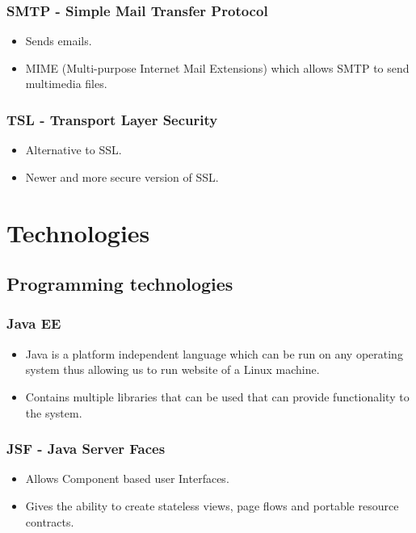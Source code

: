 \documentclass[12pt, oneside]{article}
\begin{document}
		\subsubsection{SMTP - Simple Mail Transfer Protocol}
			\begin{itemize}
				\item Sends emails.
				\item MIME (Multi-purpose Internet Mail Extensions) which allows SMTP to send multimedia files.
			\end{itemize}
		\subsubsection{TSL - Transport Layer Security}
			\begin{itemize}
				\item Alternative to SSL.
				\item Newer and more secure version of SSL.
			\end{itemize}

		
\section{Technologies}
	\subsection{Programming technologies}
		\subsubsection{Java EE}
			\begin{itemize}
				\item Java is a platform independent language which can be run on any operating system thus allowing us to run website of a Linux machine.
				\item Contains multiple libraries that can be used that can provide functionality to the system. 
			\end{itemize}
			
		\subsubsection{JSF - Java Server Faces}
			\begin{itemize}
				\item Allows Component based user Interfaces.
				\item Gives the ability to create stateless views, page flows and portable resource contracts.
			\end{itemize}
			
\end{document}
